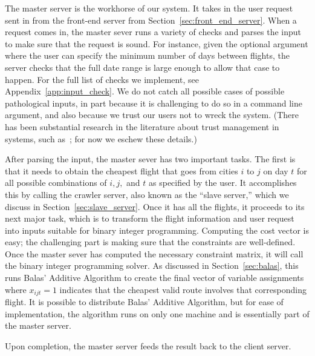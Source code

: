 \documentclass{article}
\begin{document}
The master server is the workhorse of our system. It takes in the user request sent in from the front-end server from
Section~\ref{sec:front_end_server}. When a request comes in, the master sever runs a variety of checks and parses the input to make sure that the
request is sound. For instance, given the optional argument where the user can specify the minimum number of days between flights, the server checks
that the full date range is large enough to allow that case to happen. For the full list of checks we implement, see Appendix~\ref{app:input_check}. We
do not catch all possible cases of possible pathological inputs, in part because it is challenging to do so in a command line argument, and also
because we trust our users not to wreck the system. (There has been substantial research in the literature about trust management in systems, such
as~\cite{Blaze:2001:RTM:380171.380186}; for now we eschew these details.)

After parsing the input, the master sever has two important tasks. The first is that it needs to obtain the cheapest flight that goes from cities $i$
to $j$ on day $t$ for all possible combinations of $i, j,$ and $t$ as specified by the user. It accomplishes this by calling the crawler server, also
known as the ``slave server,'' which we discuss in Section~\ref{sec:slave_server}. Once it has all the flights, it proceeds to its next major task,
which is to transform the flight information and user request into inputs suitable for binary integer programming. Computing the cost vector is easy;
the challenging part is making sure that the constraints are well-defined. Once the master sever has computed the necessary constraint matrix, it will
call the binary integer programming solver.  As discussed in Section~\ref{sec:balas}, this runs Balas' Additive Algorithm to create the final vector
of variable assignments where $x_{ijt} = 1$ indicates that the cheapest valid route involves that corresponding flight. It is possible to distribute
Balas' Additive Algorithm, but for ease of implementation, the algorithm runs on only one machine and is essentially part of the master server.

Upon completion, the master server feeds the result back to the client server.

\end{document}
